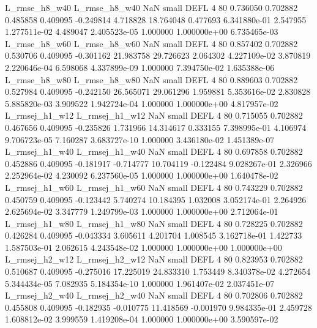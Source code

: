  L_rmse_h8_w40  L_rmse_h8_w40                   NaN      small     DEFL                 4 80 0.736050       0.702882 0.485858       0.409095   -0.249814      4.718828     18.764048     0.477693   6.341880e-01  2.547955 1.277511e-02     4.489047   2.405523e-05            1.000000    1.000000e+00        6.735465e-03
 L_rmse_h8_w60  L_rmse_h8_w60                   NaN      small     DEFL                 4 80 0.857402       0.702882 0.530706       0.409095   -0.301162     21.983758     29.726623     2.064302   4.227109e-02  3.870819 2.220646e-04     6.598068   4.337899e-09            1.000000    7.394750e-02        1.635388e-06
 L_rmse_h8_w80  L_rmse_h8_w80                   NaN      small     DEFL                 4 80 0.889603       0.702882 0.527984       0.409095   -0.242150     26.565071     29.061296     1.959881   5.353616e-02  2.830828 5.885820e-03     3.909522   1.942724e-04            1.000000    1.000000e+00        4.817957e-02
L_rmsej_h1_w12 L_rmsej_h1_w12                   NaN      small     DEFL                 4 80 0.715055       0.702882 0.467656       0.409095   -0.235826      1.731966     14.314617     0.333155   7.398995e-01  4.106974 9.706723e-05     7.160287   3.683727e-10            1.000000    3.436180e-02        1.451389e-07
L_rmsej_h1_w40 L_rmsej_h1_w40                   NaN      small     DEFL                 4 80 0.697858       0.702882 0.452886       0.409095   -0.181917     -0.714777     10.704119    -0.122484   9.028267e-01  2.326966 2.252964e-02     4.230092   6.237560e-05            1.000000    1.000000e+00        1.640478e-02
L_rmsej_h1_w60 L_rmsej_h1_w60                   NaN      small     DEFL                 4 80 0.743229       0.702882 0.450759       0.409095   -0.123442      5.740274     10.184395     1.032008   3.052174e-01  2.264926 2.625694e-02     3.347779   1.249799e-03            1.000000    1.000000e+00        2.712064e-01
L_rmsej_h1_w80 L_rmsej_h1_w80                   NaN      small     DEFL                 4 80 0.728225       0.702882 0.426284       0.409095   -0.043334      3.605611      4.201704     1.008545   3.162718e-01  1.422733 1.587503e-01     2.062615   4.243548e-02            1.000000    1.000000e+00        1.000000e+00
L_rmsej_h2_w12 L_rmsej_h2_w12                   NaN      small     DEFL                 4 80 0.823953       0.702882 0.510687       0.409095   -0.275016     17.225019     24.833310     1.753449   8.340378e-02  4.272654 5.344434e-05     7.082935   5.184354e-10            1.000000    1.961407e-02        2.037451e-07
L_rmsej_h2_w40 L_rmsej_h2_w40                   NaN      small     DEFL                 4 80 0.702806       0.702882 0.455808       0.409095   -0.182935     -0.010775     11.418569    -0.001970   9.984335e-01  2.459728 1.608812e-02     3.999559   1.419208e-04            1.000000    1.000000e+00        3.590597e-02
